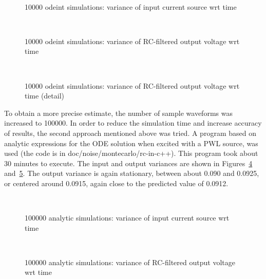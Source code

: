 \documentclass[9pt,times]{article}
\begin{document}
\begin{figure}[htbp]
\centerline{\ }
\caption{10000 {\sf odeint} simulations: variance of input current source wrt time}
\label{fig:iin-odeint-rc}
\end{figure}
\begin{figure}[htbp]
\centerline{\ }
\caption{10000 {\sf odeint} simulations: variance of RC-filtered output voltage wrt time}
\label{fig:v1-odeint-rc-wide}
\end{figure}
\begin{figure}[htbp]
\centerline{\ }
\caption{10000 {\sf odeint} simulations: variance of RC-filtered output
		voltage wrt time (detail)}
\label{fig:v1-odeint-rc-narrow}
\end{figure}

To obtain a more precise estimate, the number of sample waveforms was
increased to 100000. In order to reduce the simulation time and increase
accuracy of results, the second approach mentioned above was tried.  A
program based on analytic expressions for the ODE solution when excited with
a PWL source, was used (the code is in {\sf doc/noise/montecarlo/rc-in-c++}).
This program took about 30 minutes to execute. The input and output
variances are shown in Figures~\ref{fig:iin-analytic-rc}
and~\ref{fig:v1-analytic-rc}. The output variance is again stationary,
between about 0.090 and 0.0925, or centered around 0.0915, again close to
the predicted value of 0.0912.

\begin{figure}[htbp]
\centerline{\ }
\caption{100000 analytic simulations: variance of input current source wrt time}
\label{fig:iin-analytic-rc}
\end{figure}
\begin{figure}[htbp]
\centerline{\ }
\caption{100000 analytic simulations: variance of RC-filtered output voltage wrt time}
\label{fig:v1-analytic-rc}
\end{figure}
\end{document}
